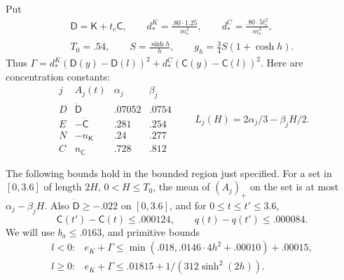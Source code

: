 Put
\[
\begin{gathered}
 \mathsf D=\mathsf K+t_c\mathsf C,\qquad
 d_*^K=\frac{.80\cdot1.25}{m_*^2},\qquad
 d_*^C=\frac{.80\cdot5t_r^2}{m_*^2},\\
 T_0=.54,\qquad S=\frac{\sinh h}{h},\qquad
 g_h=\frac34S(1+\cosh h).
\end{gathered}
\]
Thus $\Gamma=d_*^K(\mathsf D(y)-\mathsf D(l))^2+d_*^C(\mathsf C(y)-\mathsf C(l))^2$. Here are concentration constants:
\[
\begin{array}{c|c|cc}
 j & A_j(t)& \alpha_j&\beta_j\\\hline
 D&\dot{\mathsf D}&.07052&.0754\\
 E&-\dot{\mathsf C}&.281&.254\\
 N&-n_{\mathsf K}&.24&.277\\
 C& n_{\mathsf C}&.728&.812
\end{array}
\qquad L_j(H)=2\alpha_j/3-\beta_j H/2.
\]
\begin{lemma}\label{lem:segment-auxiliary}
The following bounds hold in the bounded region just specified. For a set in $[0,3.6]$ of length $2H$, $0<H\le T_0$, the mean of $(A_j)_+$ on the set is at most $\alpha_j-\beta_j H$. Also $\dot{\mathsf D}\ge-.022$ on $[0,3.6]$, and for $0\le t\le t'\le3.6$,
\[
 \mathsf C(t')-\mathsf C(t)\le .000124,\qquad q(t)-q(t')\le .000084 .
\]
We will use $b_a\le .0163$, and primitive bounds
\begin{equation}
\begin{array}{ll}
 l<0: & e_K+\Gamma\le \min(.018,.0146\cdot4 h^2+.00010)+.00015,\\
 l\ge0: & e_K+\Gamma\le .01815+1/(312\sinh^2(2h)).
\end{array}                                                               \tag{s1}\label{eq:s1}
\end{equation}

\end{lemma}
